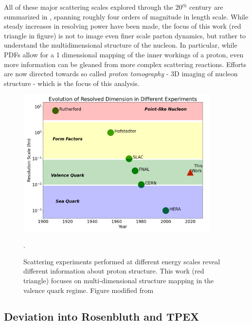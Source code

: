        All of these major scattering scales explored through the 20$^{th}$ century are summarized in , spanning roughly four orders of magnitude in length scale. While steady increases in resolving power have been made, the focus of this work (red triangle in figure) is not to image even finer scale parton dynamics, but rather to understand the multidimensional structure of the nucleon. In particular, while PDFs allow for a 1 dimensional mapping of the inner workings of a proton, even more information can be gleaned from more complex scattering reactions. Efforts are now directed towards so called \textit{proton tomography} - 3D imaging of nucleon structure - which is the focus of this analysis. 

        \begin{figure}
            \centering
            \includegraphics[width=0.9\textwidth]{Chapters/Ch1-Intro/Ch1-Sec1-Background/pics/experiment_scales.png}
            \caption[Scattering Measurements at Different Scales]{Scattering experiments performed at different energy scales reveal different information about proton structure. This work (red triangle) focuses on multi-dimensional structure mapping in the valence quark regime. Figure modified from \parencite{Klein2005ResolvingHERA}}.
            \label{fig:experimentsVsscale}
        \end{figure}


\clearpage







\iffalse
       \subsection{Deviation into Rosenbluth and TPEX}
        
